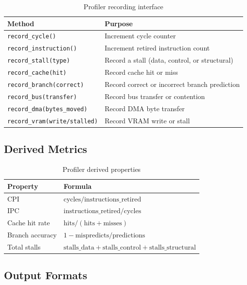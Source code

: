 \documentclass[10pt,a4paper,twoside]{book}
\begin{document}
\begin{table}[H]
\centering
\caption{Profiler recording interface}
\label{tab:profilermethods}
\begin{tabular}{ll}
\toprule
Method & Purpose \\
\midrule
\texttt{record\_cycle()} & Increment cycle counter \\
\texttt{record\_instruction()} & Increment retired instruction count \\
\texttt{record\_stall(type)} & Record a stall (data, control, or structural) \\
\texttt{record\_cache(hit)} & Record cache hit or miss \\
\texttt{record\_branch(correct)} & Record correct or incorrect branch prediction \\
\texttt{record\_bus(transfer)} & Record bus transfer or contention \\
\texttt{record\_dma(bytes\_moved)} & Record DMA byte transfer \\
\texttt{record\_vram(write/stalled)} & Record VRAM write or stall \\
\bottomrule
\end{tabular}
\end{table}

\subsection{Derived Metrics}

\begin{table}[H]
\centering
\caption{Profiler derived properties}
\label{tab:profilermetrics}
\begin{tabular}{ll}
\toprule
Property & Formula \\
\midrule
CPI & $\text{cycles} / \text{instructions\_retired}$ \\
IPC & $\text{instructions\_retired} / \text{cycles}$ \\
Cache hit rate & $\text{hits} / (\text{hits} + \text{misses})$ \\
Branch accuracy & $1 - \text{mispredicts} / \text{predictions}$ \\
Total stalls & $\text{stalls\_data} + \text{stalls\_control} + \text{stalls\_structural}$ \\
\bottomrule
\end{tabular}
\end{table}

\subsection{Output Formats}
\end{document}

